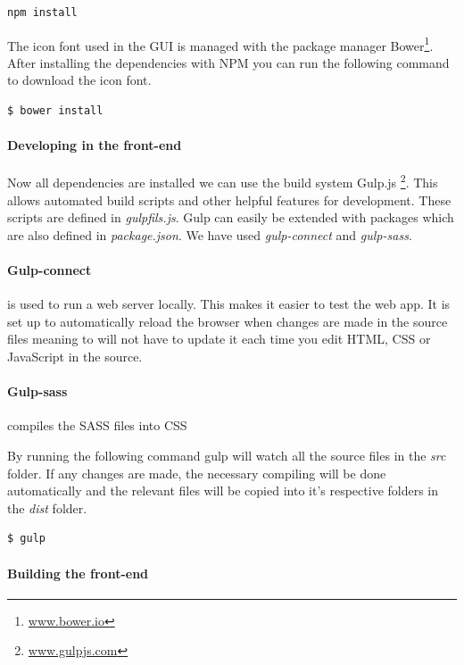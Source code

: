 \documentclass[11pt,a4paper,titlepage,oneside]{report}
\begin{document}
\begin{lstlisting}
npm install 
\end{lstlisting}

The icon font used in the \gls{GUI} is managed with the package manager Bower\footnote{\url{www.bower.io}}. After installing the dependencies with \gls{NPM} you can run the following command to download the icon font.

\begin{lstlisting}
$ bower install
\end{lstlisting}

\paragraph{Developing in the front-end}
Now all dependencies are installed we can use the build system Gulp.js \footnote{\url{www.gulpjs.com}}. This allows automated build scripts and other helpful features for development. These scripts are defined in \emph{gulpfils.js}. Gulp can easily be extended with packages which are also defined in \emph{package.json}. We have used \emph{gulp-connect} and \emph{gulp-sass}.

\paragraph{Gulp-connect}
is used to run a web server locally. This makes it easier to test the web app. It is set up to automatically reload the browser when changes are made in the source files meaning to will not have to update it each time you edit \gls{HTML}, \gls{CSS} or JavaScript in the source.

\paragraph{Gulp-sass}
compiles the \gls{SASS} files into \gls{CSS}

By running the following command gulp will watch all the source files in the \emph{src} folder. If any changes are made, the necessary compiling will be done automatically and the relevant files will be copied into it's respective folders in the \emph{dist} folder.

\begin{lstlisting}
$ gulp
\end{lstlisting}

\paragraph{Building the front-end}
\end{document}
